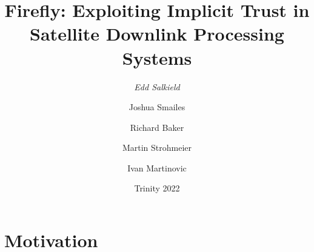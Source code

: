 \documentclass{beamer}
\begin{document}

\title{Firefly: Exploiting Implicit Trust in Satellite Downlink Processing Systems}
\author[Edd Salkield]{
  \emph{Edd Salkield}
  \and
  Joshua Smailes
  \and
  Richard Baker
  \and
  Martin Strohmeier
  \and
  Ivan Martinovic
}
\date{Trinity 2022}

\begin{frame}
  \titlepage
\end{frame}

\section{Motivation}
\end{document}
